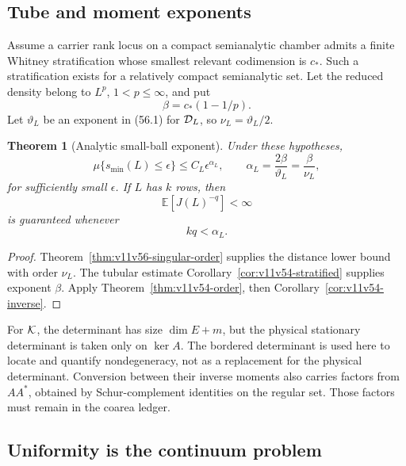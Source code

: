 \documentclass[11pt]{article}
\newtheorem{theorem}{Theorem}[section]
\begin{document}
\subsection{Tube and moment exponents}

Assume a carrier rank locus on a compact semianalytic chamber admits a
finite Whitney stratification whose smallest relevant codimension is
\(c_*\).  Such a stratification exists for a relatively compact
semianalytic set.  Let the reduced density belong to \(L^p\),
\(1<p\le\infty\), and put
\[
                         \beta=c_*(1-1/p).                    \tag{56.13}
\]
Let \(\vartheta_L\) be an exponent in (56.1) for
\({\cal D}_L\), so \(\nu_L=\vartheta_L/2\).

\begin{theorem}[Analytic small-ball exponent]
\label{thm:v11v56-small-ball}
Under these hypotheses,
\[
 \mu\{s_{\min}(L)\le\epsilon\}
              \le C_L\epsilon^{\alpha_L},\qquad
 \alpha_L=\frac{2\beta}{\vartheta_L}
          =\frac{\beta}{\nu_L},                              \tag{56.14}
\]
for sufficiently small \(\epsilon\).  If \(L\) has \(k\) rows, then
\[
                          \mathbb E[J(L)^{-q}]<\infty         \tag{56.15}
\]
is guaranteed whenever
\[
                         kq<\alpha_L.                         \tag{56.16}
\]
\end{theorem}

\begin{proof}
Theorem~\ref{thm:v11v56-singular-order} supplies the distance lower
bound with order \(\nu_L\).  The tubular estimate
Corollary~\ref{cor:v11v54-stratified} supplies exponent \(\beta\).
Apply Theorem~\ref{thm:v11v54-order}, then
Corollary~\ref{cor:v11v54-inverse}.
\end{proof}

\begin{warning}
\label{warn:v11v56-carrier-dimension}
For \({\cal K}\), the determinant has size \(\dim E+m\), but the
physical stationary determinant is taken only on \(\ker A\).
The bordered determinant is used here to locate and quantify
nondegeneracy, not as a replacement for the physical determinant.
Conversion between their inverse moments also carries factors from
\(AA^*\), obtained by Schur-complement identities on the regular set.
Those factors must remain in the coarea ledger.
\end{warning}

\subsection{Uniformity is the continuum problem}
\end{document}
